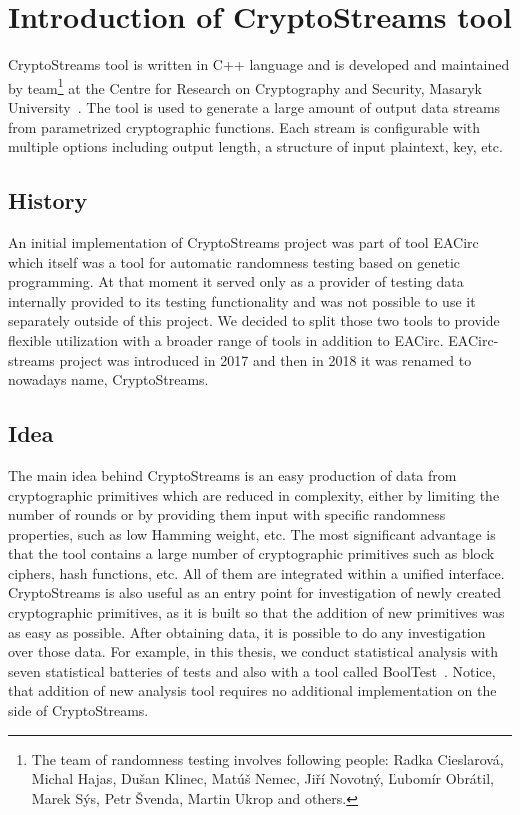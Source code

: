 \documentclass[
    digital,    %
    oneside,    %
    color,
    11pt,
    nocover,
    notable,
    nolof,
    nolot,
    final
]{fithesis3}
\renewcommand\_{\textunderscore\allowbreak}
\begin{document}
\chapter{Introduction of CryptoStreams tool}
\label{chap:cryptostreams}

CryptoStreams tool is written in C++ language and is developed and maintained by team\footnote{The team of randomness testing involves following people: Radka Cieslarová, Michal Hajas, Dušan Klinec, Matúš Nemec, Jiří Novotný, Ľubomír Obrátil, Marek Sýs, Petr Švenda, Martin Ukrop and others.} at the Centre for Research on Cryptography and Security, Masaryk University~\cite{CryptoStreams}. The tool is used to generate a large amount of output data streams from parametrized cryptographic functions. Each stream is configurable with multiple options including output length, a structure of input plaintext, key, etc. 

\section{History}

An initial implementation of CryptoStreams project was part of tool EACirc~\cite{EACirc} which itself was a tool for automatic randomness testing based on genetic programming. At that moment it served only as a provider of testing data internally provided to its testing functionality and was not possible to use it separately outside of this project. We decided to split those two tools to provide flexible utilization with a broader range of tools in addition to EACirc. EACirc-streams project was introduced in 2017 and then in 2018 it was renamed to nowadays name, CryptoStreams.

\section{Idea}

The main idea behind CryptoStreams is an easy production of data from cryptographic primitives which are reduced in complexity, either by limiting the number of rounds or by providing them input with specific randomness properties, such as low Hamming weight, etc. The most significant advantage is that the tool contains a large number of cryptographic primitives such as block ciphers, hash functions, etc. All of them are integrated within a unified interface. CryptoStreams is also useful as an entry point for investigation of newly created cryptographic primitives, as it is built so that the addition of new primitives was as easy as possible. After obtaining data, it is possible to do any investigation over those data. For example, in this thesis, we conduct statistical analysis with seven statistical batteries of tests and also with a tool called BoolTest~\cite{booltest-secrypt2017}. Notice, that addition of new analysis tool requires no additional implementation on the side of CryptoStreams.
\end{document}
